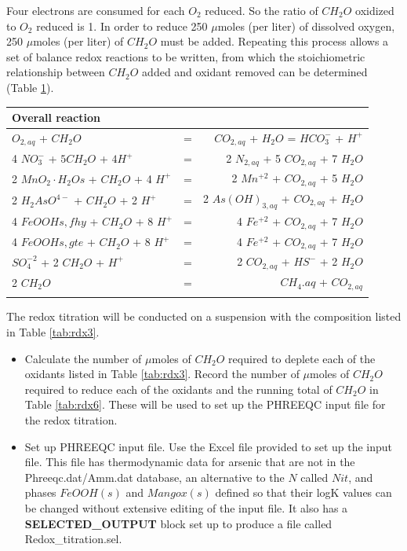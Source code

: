 Four electrons are consumed for each $O_2$ reduced.  
So the ratio of $CH_2O$ oxidized to $O_2$ reduced is 1.  
In order to reduce 250 $\mu$moles (per liter) of dissolved oxygen, 
250 $\mu$moles (per liter) of $CH_2O$ must be added.
Repeating this process allows a set of balance redox 
reactions to be written, from which the stoichiometric relationship 
between $CH_2O$ added and oxidant removed can be determined 
(Table \ref{tab:rdx4}).


\begin{table}[h]
\centering
\footnotesize
\begin{tabular}{lcr}
\toprule
Overall reaction		& &														         \\ \hline 
$O_{2,aq}$ +  $CH_2O$               &=& $CO_{2,aq}$ + $H_2O$ = $HCO_3^-$ + $H^+$  \\
4 $NO_3^-$ +   $5CH_2O$ + $4H^+$    &=&  2 $N_{2,aq}$ + 5 $CO_{2,aq}$ + 7 $H_2O$ \\
2 $MnO_2·H_2Os$ + $CH_2O$ + 4 $H^+$ &=& 2 $Mn^{+2}$ + $CO_{2,aq}$ + 5 $H_2O$ \\
2 $H_2AsO^{4-}$ + $CH_2O$ + 2 $H^+$ &=&  2 $As(OH)_{3,aq}$ + $CO_{2,aq}$ + $H_2O$ \\
4 $FeOOHs,fhy$ +  $CH_2O$ + 8 $H^+$ &=&  4 $Fe^{+2}$ +  $CO_{2,aq}$ + 7 $H_2O$ \\
4 $FeOOHs,gte$ +  $CH_2O$ + 8 $H^+$ &=&  4 $Fe^{+2}$ +  $CO_{2,aq}$ + 7 $H_2O$ \\
  $SO_4^{-2}$ +  2 $CH_2O$ + $H^+$  &=&   2 $CO_{2,aq}$ +  $HS^-$ + 2 $H_2O$ \\
2 $CH_2O$                           &=& $CH_4.aq$ + $CO_{2,aq}$ \\
\bottomrule
\label{tab:rdx4}
\end{tabular}
\end{table}	

The redox titration will be conducted on a suspension with the composition listed in Table \ref{tab:rdx3}.


\begin{itemize}
\item Calculate the number of $\mu$moles of $CH_2O$ required to deplete each 
of the oxidants listed in Table \ref{tab:rdx3}.  
Record the number of $\mu$moles of $CH_2O$ required to reduce each of the oxidants 
and the running total of $CH_2O$ in Table \ref{tab:rdx6}.  
These will be used to set up the PHREEQC input file for the redox titration. 

\item Set up PHREEQC input file. Use the Excel file provided to set up the input file.  
This file has thermodynamic data for arsenic that are not in the Phreeqc.dat/Amm.dat database, 
an alternative to the $N$ called $Nit$, 
and phases $FeOOH(s)$ and $Mangox(s)$ defined so that their 
logK values can be changed without extensive editing of the input file.  
It also has a {\color{red} \textbf{SELECTED\_OUTPUT}} 
block set up to produce a file called {\color{blue} Redox\_titration.sel}.

\end{itemize}

